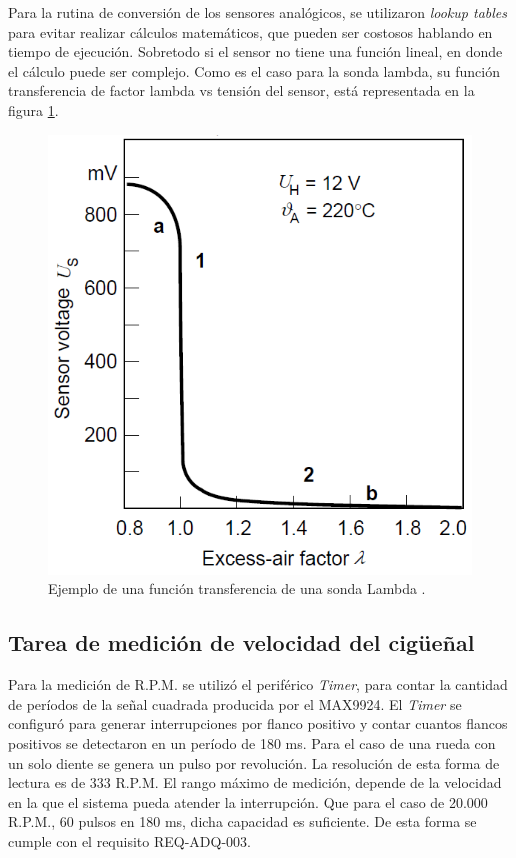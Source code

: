 Para la rutina de conversión de los sensores analógicos, se utilizaron \textit{lookup tables} para evitar realizar cálculos matemáticos, que pueden ser costosos hablando en tiempo de ejecución. Sobretodo si el sensor no tiene una función lineal, en donde el cálculo puede ser complejo. Como es el caso para la sonda lambda, su función transferencia de factor lambda vs tensión del sensor, está representada en la figura \ref{fig:funcion-lambda}.

\begin{figure}[htpb]
\centering
\includegraphics[width=.55\textwidth]{./Figures/funcion-lambda.png}
\caption{Ejemplo de una función transferencia de una sonda Lambda \protect\footnotemark[3].}
\label{fig:funcion-lambda}
\end{figure}

\subsection{Tarea de medición de velocidad del cigüeñal}

Para la medición de R.P.M. se utilizó el periférico \textit{Timer}, para contar la cantidad de períodos de la señal cuadrada producida por el MAX9924. El \textit{Timer} se configuró para generar interrupciones por flanco positivo y contar cuantos flancos positivos se detectaron en un período de 180 ms. Para el caso de una rueda con un solo diente se genera un pulso por revolución. La resolución de esta forma de lectura es de 333 R.P.M. El rango máximo de medición, depende de la velocidad en la que el sistema pueda atender la interrupción. Que para el caso de 20.000 R.P.M., 60 pulsos en 180 ms, dicha capacidad es suficiente. De esta forma se cumple con el requisito REQ-ADQ-003.

